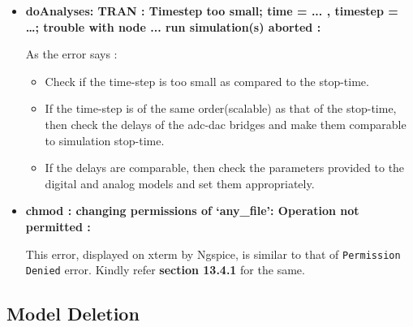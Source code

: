 \begin{itemize}
\item \textbf{doAnalyses: TRAN : Timestep too small; time = ... , timestep = …; 
       trouble with node ... 
       run simulation(s) aborted :}

As the error says :
\begin{itemize}
    \item Check if the time-step is too small as compared to the stop-time. 
    \item If the time-step is of the same order(scalable) as that of the stop-time, then check the delays of the adc-dac bridges and make them comparable to simulation stop-time.
    \item If the delays are comparable, then check the parameters provided to the digital and analog models  and set them appropriately.
\end{itemize}

\item \textbf{chmod : changing permissions of ‘any\_file’: Operation not permitted : }

This error, displayed on xterm by Ngspice, is similar to that of \texttt{Permission Denied} error. Kindly refer \textbf{section 13.4.1} for the same.
\end{itemize}

\subsection{Model Deletion}

